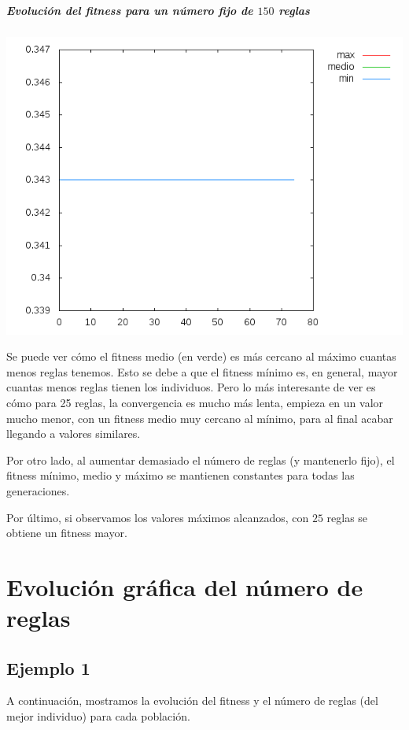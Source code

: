 \documentclass[nochap]{apuntes}
\begin{document}
\paragraph{Evolución del fitness para un número fijo de $150$ reglas}
\begin{center}
\includegraphics[scale=0.6]{tex/img/g75_p75_MejoresPorPeores_SeleccionProporcionalAlFitness_reg150.png}
\end{center}

Se puede ver cómo el fitness medio (en verde) es más cercano al máximo cuantas menos reglas tenemos. Esto se debe a que el fitness mínimo es, en general, mayor cuantas menos reglas tienen los individuos. Pero lo más interesante de ver es cómo para 25 reglas, la convergencia es mucho más lenta, empieza en un valor mucho menor, con un fitness medio muy cercano al mínimo, para al final acabar llegando a valores similares.

Por otro lado, al aumentar demasiado el número de reglas (y mantenerlo fijo), el fitness mínimo, medio y máximo se mantienen constantes para todas las generaciones.

Por último, si observamos los valores máximos alcanzados, con $25$ reglas se obtiene un fitness mayor.


\chapter{Evolución gráfica del número de reglas}
\section{Ejemplo 1}
A continuación, mostramos la evolución del fitness y el número de reglas (del mejor individuo) para cada población.
\end{document}
